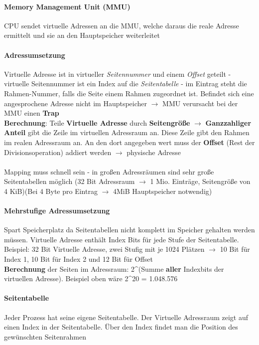 \documentclass[11pt,a4paper,landscape]{article}
\begin{document}
\begin{multicols*}{3}
	\paragraph{Memory Management Unit (MMU)} CPU sendet virtuelle Adressen an die MMU, welche daraus die reale Adresse ermittelt und sie an den Hauptspeicher weiterleitet
	\paragraph{Adressumsetzung} Virtuelle Adresse ist in virtueller \textit{Seitennummer} und einem \textit{Offset} geteilt - virtuelle Seitennummer ist ein Index auf die \textit{Seitentabelle} - im Eintrag steht die Rahmen-Nummer, falls die Seite einem Rahmen zugeordnet ist. Befindet sich eine angesprochene Adresse nicht im Hauptspeicher $\rightarrow$ MMU verursacht bei der MMU einen \textbf{Trap}\\ \textbf{Berechnung}: Teile \textbf{Virtuelle Adresse} durch \textbf{Seitengröße} $\rightarrow$ \textbf{Ganzzahliger Anteil} gibt die Zeile im virtuellen Adressraum an. Diese Zeile gibt den Rahmen im realen Adressraum an. An den dort angegeben wert muss der \textbf{Offset} (Rest der Divisionsoperation) addiert werden $\rightarrow$ physische Adresse\\\\
	Mapping muss schnell sein - in großen Adressräumen sind sehr große Seitentabellen möglich (32 Bit Adressraum $\rightarrow$ 1 Mio. Einträge, Seitengröße von 4 KiB)(Bei 4 Byte pro Eintrag $\rightarrow$ 4MiB Hauptspeicher notwendig)
	\paragraph{Mehrstufige Adressumsetzung} Spart Speicherplatz da Seitentabellen nicht komplett im Speicher gehalten werden müssen. Virtuelle Adresse enthält Index Bits für jede Stufe der Seitentabelle. Beispiel: 32 Bit Virtuelle Adresse, zwei Stufig mit je 1024 Plätzen $\rightarrow$ 10 Bit für Index 1, 10 Bit für Index 2 und 12 Bit für Offset\\
	\textbf{Berechnung} der Seiten im Adressraum: 2\^{}(Summe \textbf{aller} Indexbits der virtuellen Adresse). Beispiel oben wäre 2\^{}20 = 1.048.576
	\paragraph{Seitentabelle} Jeder Prozess hat seine eigene Seitentabelle. Der Virtuelle Adressraum zeigt auf einen Index in der Seitentabelle. Über den Index findet man die Position des gewünschten Seitenrahmen

\end{multicols*}
\end{document}
